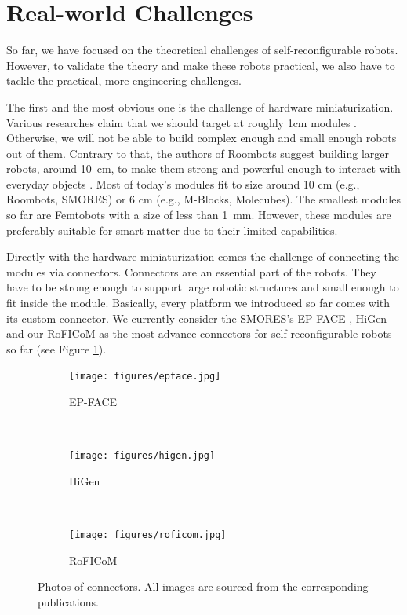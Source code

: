 \section{Real-world Challenges}\label{sec:mixed-challenges}

So far, we have focused on the theoretical challenges of self-reconfigurable
robots. However, to validate the theory and make these robots practical, we
also have to tackle the practical, more engineering challenges.

The first and the most obvious one is the challenge of hardware miniaturization.
Various researches claim that we should target at roughly 1cm modules
\cite{1285597, DBLP:conf/ieeealife/Christensen07}. Otherwise, we will not be
able to build complex enough and small enough robots out of them. Contrary to
that, the authors of Roombots suggest building larger robots, around 10~cm, to
make them strong and powerful enough to interact with everyday objects
\cite{DBLP:conf/icra/SprowitzBDI09}. Most of today's modules fit to size around
10 cm (e.g., Roombots, SMORES) or 6 cm (e.g., M-Blocks, Molecubes). The smallest
modules so far are Femtobots \cite{Femtobots} with a size of less than 1~mm.
However, these modules are preferably suitable for smart-matter due to their
limited capabilities.

Directly with the hardware miniaturization comes the challenge of connecting the
modules via connectors. Connectors are an essential part of the robots. They
have to be strong enough to support large robotic structures and small enough to
fit inside the module. Basically, every platform we introduced so far comes with
its custom connector. We currently consider the SMORES's EP-FACE
\cite{DBLP:conf/iros/TosunDLY16}, HiGen \cite{DBLP:conf/iros/ParrottDG14} and
our RoFICoM \cite{DBLP:conf/iros/MrazekB19} as the most advance connectors for
self-reconfigurable robots so far (see Figure \ref{fig:connectors}).

\begin{figure}[!t]
    \centering
    \begin{subfigure}[b]{0.315\textwidth}
        \centering
        \texttt{[image: figures/epface.jpg]}
        \caption{EP-FACE}
    \end{subfigure}
    ~
    \begin{subfigure}[b]{0.315\textwidth}
        \centering
        \texttt{[image: figures/higen.jpg]}
        \caption{HiGen}
    \end{subfigure}
    ~
    \begin{subfigure}[b]{0.315\textwidth}
        \centering
        \texttt{[image: figures/roficom.jpg]}
        \caption{RoFICoM}
    \end{subfigure}

    \caption{Photos of connectors. All images are sourced from the corresponding publications.}
    \label{fig:connectors}
\end{figure}

